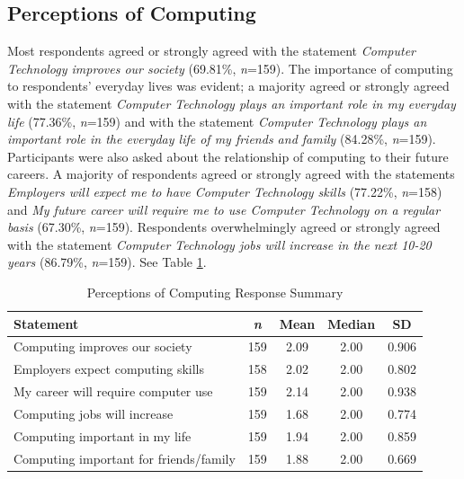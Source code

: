 \documentclass{article}
\begin{document}
\subsection{Perceptions of Computing}
Most respondents agreed or strongly agreed with the statement \textit{Computer Technology improves our society} (69.81\%, \textit{n}=159). The importance of computing to respondents’ everyday lives was evident; a majority agreed or strongly agreed with the statement \textit{Computer Technology plays an important role in my everyday life} (77.36\%, \textit{n}=159) and with the statement \textit{Computer Technology plays an important role in the everyday life of my friends and family} (84.28\%, \textit{n}=159). Participants were also asked about the relationship of computing to their future careers. A majority of respondents agreed or strongly agreed with the statements \textit{Employers will expect me to have Computer Technology skills} (77.22\%, \textit{n}=158) and \textit{My future career will require me to use Computer Technology on a regular basis} (67.30\%, \textit{n}=159). Respondents overwhelmingly agreed or strongly agreed with the statement \textit{Computer Technology jobs will increase in the next 10-20 years} (86.79\%, \textit{n}=159). See Table \ref{table:comp}.
\begin{table}[h]
\caption{Perceptions of Computing Response Summary} %
\label{table:comp} %
\centering %
\begin{tabular}{l c c c c } %
\hline\hline %
Statement & \textit{n} & Mean & Median & SD \\  %
\hline %
Computing improves our society & 159 & 2.09 & 2.00 & 0.906 \\
Employers expect computing skills & 158 & 2.02 & 2.00 & 0.802 \\
My career will require computer use & 159 & 2.14 & 2.00 & 0.938 \\
Computing jobs will increase & 159 & 1.68 & 2.00 & 0.774 \\
Computing important in my life & 159 & 1.94 & 2.00 & 0.859 \\
Computing important for friends/family & 159 & 1.88 & 2.00 & 0.669 \\
\hline %
\end{tabular}
\end{table}
\end{document}
